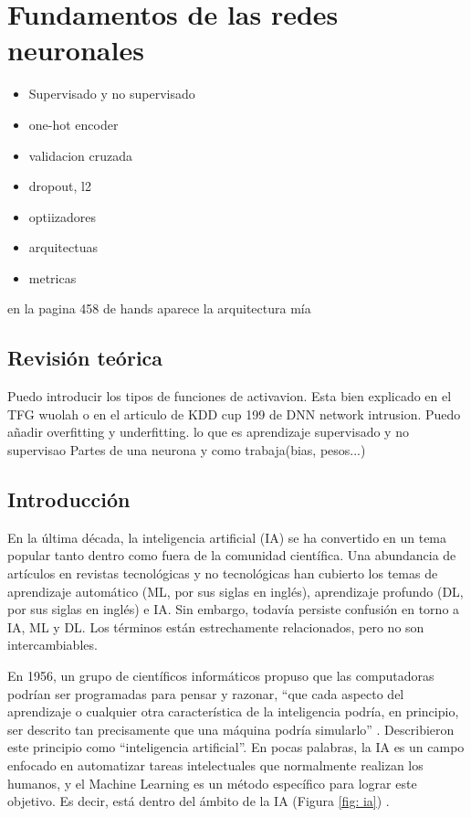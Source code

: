 \chapter{Fundamentos de las redes neuronales} \label{Capitulo_2}
\begin{itemize}
	\item Supervisado y no supervisado
	\item one-hot encoder
	\item validacion cruzada
	\item dropout, l2
	\item optiizadores
	\item arquitectuas
	\item metricas
\end{itemize}
en la pagina 458 de hands aparece la arquitectura mía


\section{Revisión teórica} \label{Subsec: 3_1}
Puedo introducir los tipos de funciones de activavion. Esta bien explicado en el TFG wuolah o en el articulo de KDD cup 199 de DNN network intrusion.
Puedo añadir overfitting y underfitting.
lo que es aprendizaje supervisado y no supervisao
Partes de una neurona y como trabaja(bias, pesos...)



\section{Introducción}

En la última década, la inteligencia artificial (IA) se ha convertido en un tema popular tanto dentro como fuera de la comunidad científica. Una abundancia de artículos en revistas tecnológicas y no tecnológicas han cubierto los temas de aprendizaje automático (ML, por sus siglas en inglés), aprendizaje profundo (DL, por sus siglas en inglés) e IA. Sin embargo, todavía persiste confusión en torno a IA, ML y DL. Los términos están estrechamente relacionados, pero no son intercambiables. 

En 1956, un grupo de científicos informáticos propuso que las computadoras podrían ser programadas para pensar y razonar, ``que cada aspecto del aprendizaje o cualquier otra característica de la inteligencia podría, en principio, ser descrito tan precisamente que una máquina podría simularlo'' \citep{moor2006dartmouth}. Describieron este principio como ``inteligencia artificial''. En pocas palabras, la IA es un campo enfocado en automatizar tareas intelectuales que normalmente realizan los humanos, y el Machine Learning es un método específico para lograr este objetivo. Es decir, está dentro del ámbito de la IA (Figura \ref{fig: ia}) \citep{choi2020introduction}. 

